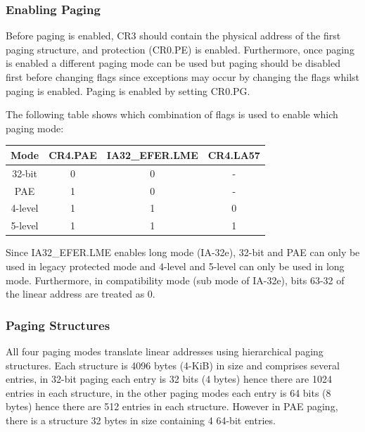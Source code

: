 \documentclass{article}
\newcommand{\layout}[1]{\parbox{\linewidth}{#1}}
\begin{document}
\layout{
  \subsubsection{Enabling Paging}

  Before paging is enabled, CR3 should contain the physical address of the first paging structure, and protection (CR0.PE) is enabled.
  Furthermore, once paging is enabled a different paging mode can be used but paging should be disabled first before changing flags since exceptions may occur by changing the flags whilst paging is enabled.
  Paging is enabled by setting CR0.PG.

  \bigskip \cite[Chapter~5.1.2]{sdm3}
} \bigskip

\layout{
  The following table shows which combination of flags is used to enable which paging mode:
  \begin{table}[H]
    \centering
    \begin{tabular}{|c|c|c|c|}
      \hline \textbf{Mode} & \textbf{CR4.PAE} & \textbf{IA32\_EFER.LME} & \textbf{CR4.LA57} \\ \hline
      32-bit & 0 & 0 & -  \\
      PAE & 1 & 0 & -  \\
      4-level & 1 & 1 & 0 \\
      5-level & 1 & 1 & 1 \\ \hline
    \end{tabular}
  \end{table}
}

\layout{
  Since IA32\_EFER.LME enables long mode (IA-32e), 32-bit and PAE can only be used in legacy protected mode and 4-level and 5-level can only be used in long mode.
  Furthermore, in compatibility mode (sub mode of IA-32e), bits 63-32 of the linear address are treated as 0.

  \bigskip \cite[Chapter~5.1.1]{sdm3}
}

\layout{
  \subsubsection{Paging Structures}

  All four paging modes translate linear addresses using hierarchical paging structures.
  Each structure is 4096 bytes (4-KiB) in size and comprises several entries,
  in 32-bit paging each entry is 32 bits (4 bytes) hence there are 1024 entries in each structure,
  in the other paging modes each entry is 64 bits (8 bytes) hence there are 512 entries in each structure.
  However in PAE paging, there is a structure 32 bytes in size containing 4 64-bit entries.
} \bigskip
\end{document}
